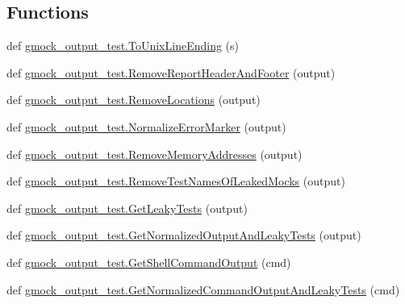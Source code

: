 \subsection*{Functions}
\begin{DoxyCompactItemize}
\item 
def \mbox{\hyperlink{namespacegmock__output__test_a5c9ae3611cc4fac1e1340a3345865cf3}{gmock\+\_\+output\+\_\+test.\+To\+Unix\+Line\+Ending}} (s)
\item 
def \mbox{\hyperlink{namespacegmock__output__test_a2ebfc0abfb0ed307021ecaa9da465c55}{gmock\+\_\+output\+\_\+test.\+Remove\+Report\+Header\+And\+Footer}} (output)
\item 
def \mbox{\hyperlink{namespacegmock__output__test_aa3c93f8085ff0886bf0d160d71af2452}{gmock\+\_\+output\+\_\+test.\+Remove\+Locations}} (output)
\item 
def \mbox{\hyperlink{namespacegmock__output__test_af3c1f95f19b9f048843a2d562d459b24}{gmock\+\_\+output\+\_\+test.\+Normalize\+Error\+Marker}} (output)
\item 
def \mbox{\hyperlink{namespacegmock__output__test_a58b4fdb82b40d01d32b09d4c14ba11a5}{gmock\+\_\+output\+\_\+test.\+Remove\+Memory\+Addresses}} (output)
\item 
def \mbox{\hyperlink{namespacegmock__output__test_ac0628c5630d869dae45601df9d909638}{gmock\+\_\+output\+\_\+test.\+Remove\+Test\+Names\+Of\+Leaked\+Mocks}} (output)
\item 
def \mbox{\hyperlink{namespacegmock__output__test_a60299c4f0cb666d08f101ddaa7aabed4}{gmock\+\_\+output\+\_\+test.\+Get\+Leaky\+Tests}} (output)
\item 
def \mbox{\hyperlink{namespacegmock__output__test_a590ba3b918e5599eeabc2cbf597e2ce1}{gmock\+\_\+output\+\_\+test.\+Get\+Normalized\+Output\+And\+Leaky\+Tests}} (output)
\item 
def \mbox{\hyperlink{namespacegmock__output__test_a001498a3e9bf552ee429e434eb00cb08}{gmock\+\_\+output\+\_\+test.\+Get\+Shell\+Command\+Output}} (cmd)
\item 
def \mbox{\hyperlink{namespacegmock__output__test_a1796bc395fbfb8873992e3f84378e4bf}{gmock\+\_\+output\+\_\+test.\+Get\+Normalized\+Command\+Output\+And\+Leaky\+Tests}} (cmd)
\end{DoxyCompactItemize}
